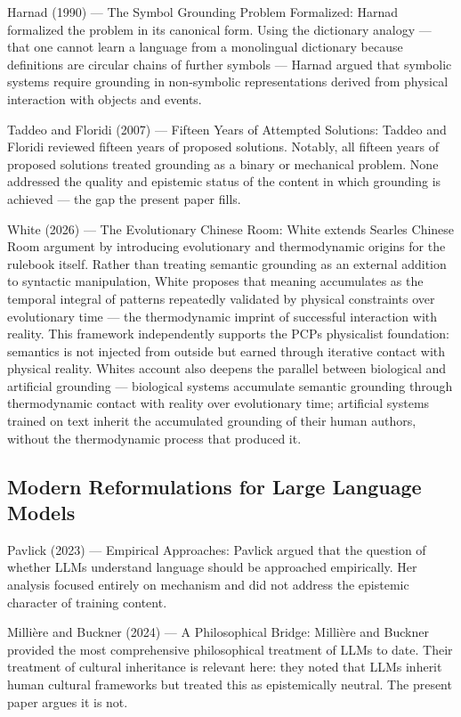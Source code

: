 \documentclass[12pt]{article}
\begin{document}
Harnad (1990) --- The Symbol Grounding Problem Formalized: Harnad
formalized the problem in its canonical form. Using the dictionary
analogy --- that one cannot learn a language from a monolingual
dictionary because definitions are circular chains of further symbols
--- Harnad argued that symbolic systems require grounding in
non-symbolic representations derived from physical interaction with
objects and events.

Taddeo and Floridi (2007) --- Fifteen Years of Attempted Solutions:
Taddeo and Floridi reviewed fifteen years of proposed solutions.
Notably, all fifteen years of proposed solutions treated grounding as a
binary or mechanical problem. None addressed the quality and epistemic
status of the content in which grounding is achieved --- the gap the
present paper fills.

White (2026) --- The Evolutionary Chinese Room: White extends
Searle\textquotesingle s Chinese Room argument by introducing
evolutionary and thermodynamic origins for the rulebook itself. Rather
than treating semantic grounding as an external addition to syntactic
manipulation, White proposes that meaning accumulates as the temporal
integral of patterns repeatedly validated by physical constraints over
evolutionary time --- the thermodynamic imprint of successful
interaction with reality. This framework independently supports the
PCP\textquotesingle s physicalist foundation: semantics is not injected
from outside but earned through iterative contact with physical reality.
White\textquotesingle s account also deepens the parallel between
biological and artificial grounding --- biological systems accumulate
semantic grounding through thermodynamic contact with reality over
evolutionary time; artificial systems trained on text inherit the
accumulated grounding of their human authors, without the thermodynamic
process that produced it.

\subsection{Modern Reformulations for Large Language Models}\label{b.2-modern-reformulations-for-large-language-models}

Pavlick (2023) --- Empirical Approaches: Pavlick argued that the
question of whether LLMs understand language should be approached
empirically. Her analysis focused entirely on mechanism and did not
address the epistemic character of training content.

Millière and Buckner (2024) --- A Philosophical Bridge: Millière and
Buckner provided the most comprehensive philosophical treatment of LLMs
to date. Their treatment of cultural inheritance is relevant here: they
noted that LLMs inherit human cultural frameworks but treated this as
epistemically neutral. The present paper argues it is not.
\end{document}
